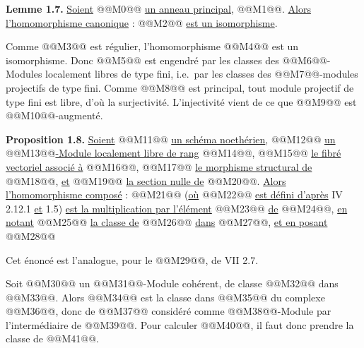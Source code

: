
\textbf{Lemme 1.7.} \uline{Soient} @@M0@@ \uline{un anneau principal}, @@M1@@. \uline{Alors l'homomorphisme canonique} :
@@M2@@
\uline{est un isomorphisme}.

Comme @@M3@@ est régulier, l'homomorphisme @@M4@@ est un isomorphisme. Donc @@M5@@ est engendré par les classes des @@M6@@-Modules localement libres de type fini, i.e.\ par les classes des @@M7@@-modules projectifs de type fini. Comme @@M8@@ est principal, tout module projectif de type fini est libre, d'où la surjectivité. L'injectivité vient de ce que @@M9@@ est @@M10@@-augmenté.

\textbf{Proposition 1.8.} \uline{Soient} @@M11@@ \uline{un schéma noethérien}, @@M12@@ \uline{un} @@M13@@\uline{-Module localement libre de rang} @@M14@@, @@M15@@ \uline{le fibré vectoriel associé à} @@M16@@, @@M17@@ \uline{le morphisme structural de} @@M18@@, \uline{et} @@M19@@ \uline{la section nulle de} @@M20@@. \uline{Alors l'homomorphisme composé} :
@@M21@@
(\uline{où} @@M22@@ \uline{est défini d'après} IV 2.12.1 \uline{et} 1.5) \uline{est la multiplication par l'élément} @@M23@@ \uline{de} @@M24@@, \uline{en notant} @@M25@@ \uline{la classe de} @@M26@@ \uline{dans} @@M27@@, \uline{et en posant}
@@M28@@

Cet énoncé est l'analogue, pour le @@M29@@, de VII 2.7.

Soit @@M30@@ un @@M31@@-Module cohérent, de classe @@M32@@ dans @@M33@@. Alors @@M34@@ est la classe dans @@M35@@ du complexe @@M36@@, donc de @@M37@@ considéré comme @@M38@@-Module par l'intermédiaire de @@M39@@. Pour calculer @@M40@@, il faut donc prendre la classe de @@M41@@.

